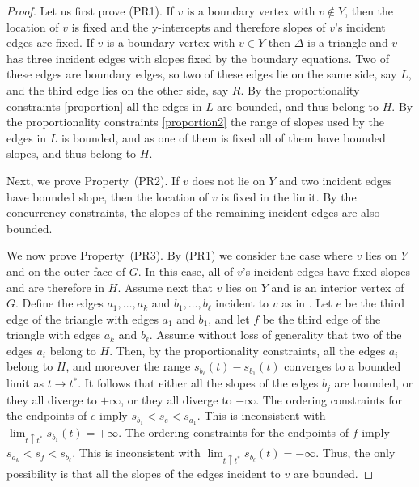 	\begin{proof}
Let us first prove (PR1). If $v$ is a boundary vertex with $v\not\in Y$, then
the location of $v$ is fixed and the y-intercepts and therefore slopes of
$v$'s incident edges are fixed.  If $v$ is a boundary vertex with $v\in Y$ 
then $\Delta$ is a triangle and $v$ has three incident edges with slopes 
fixed by the boundary equations. Two of these edges are boundary edges, 
so two of these edges lie on the same side, say $L$, and the third edge 
lies on the other side, say $R$. By the proportionality constraints \eqref{proportion}
all the edges in $L$ are bounded, and thus belong to $H$. By the 
proportionality constraints \eqref{proportion2} the range of slopes used by the edges in 
$L$ is bounded, and as one of them is fixed all of them have bounded 
slopes, and thus belong to $H$.

		Next, we prove Property~(PR2).	If $v$ does not lie on $Y$ and two incident edges have bounded slope, then the location of $v$ is fixed in the limit.
		By the concurrency constraints, the slopes of the remaining incident
		edges are also bounded.
		
		We now prove Property~(PR3). By (PR1) we consider the case where $v$ lies on $Y$ and on the outer face of $G$.  In this case, all of $v$'s incident edges have fixed slopes and are therefore in $H$. Assume next that $v$ lies on $Y$ and is an interior vertex of $G$.  Define the edges $a_1,\ldots,a_k$
		and $b_1,\ldots,b_\ell$ incident to $v$ as in .  Let $e$ be the third edge of the triangle with edges $a_1$ and $b_1$, and let
		$f$ be the third edge of the triangle with edges $a_k$ and $b_\ell$.
		Assume without loss of generality that two of the edges $a_i$ belong to $H$. Then, by the proportionality constraints, all the edges $a_i$ belong to $H$, and moreover the range $s_{b_\ell}(t)-s_{b_1}(t)$ converges to a bounded limit as $t\to t^*$.  It follows that either all the slopes of the edges $b_j$ are bounded, or they all diverge to $+\infty$,
		or they all diverge to $-\infty$. The ordering constraints for the
		endpoints of $e$ imply \begin{math}
		s_{b_1}<s_e<s_{a_1}
		\end{math}.
		This is inconsistent with $\lim_{t\uparrow t^*} s_{b_1}(t)=+\infty$.
		The ordering constraints for the endpoints of $f$ imply
		\begin{math}
		s_{a_k}<s_f<s_{b_\ell}
		\end{math}.
		This is inconsistent with $\lim_{t\uparrow t^*} s_{b_\ell}(t)=-\infty$. Thus, the only
		possibility is that all the slopes of the edges incident to $v$ are bounded.
		

\end{proof}
